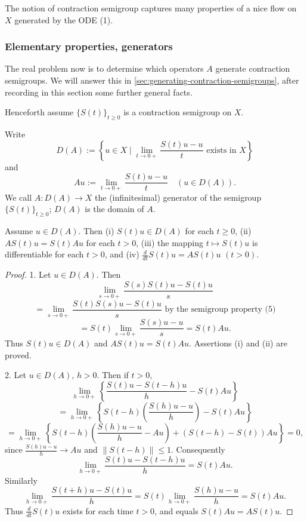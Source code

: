 The notion of contraction semigroup captures many properties of a nice flow on $X$ generated by the ODE (1).

\subsubsection{Elementary properties, generators}

The real problem now is to determine which operators $A$ generate contraction semigroups. We will answer this in \cref{sec:generating-contraction-semigroups}, after recording in this section some further general facts.

Henceforth assume $\{S(t)\}_{t \geq 0}$ is a contraction semigroup on $X$.

\begin{definition}
\label{def:semigroup-generator}
Write
\[
D(A) := \left\{u \in X \mid \lim_{t \to 0+} \frac{S(t)u - u}{t} \text{ exists in } X\right\}
\tag{8}
\]
and
\[
Au := \lim_{t \to 0+} \frac{S(t)u - u}{t} \quad (u \in D(A)).
\tag{9}
\]
We call $A : D(A) \to X$ the (infinitesimal) generator of the semigroup $\{S(t)\}_{t \geq 0}$; $D(A)$ is the domain of $A$.
\end{definition}

\begin{theorem}
\label{thm:semigroup-differential-properties}
Assume $u \in D(A)$. Then
(i) $S(t)u \in D(A)$ for each $t \geq 0$,
(ii) $AS(t)u = S(t)Au$ for each $t > 0$,
(iii) the mapping $t \mapsto S(t)u$ is differentiable for each $t > 0$,
and
(iv) $\frac{d}{dt}S(t)u = AS(t)u$ \quad $(t > 0)$.
\end{theorem}

\begin{proof}
1. Let $u \in D(A)$. Then
\[
\lim_{s \to 0+} \frac{S(s)S(t)u - S(t)u}{s}
\]
\[
= \lim_{s \to 0+} \frac{S(t)S(s)u - S(t)u}{s} \text{ by the semigroup property (5)}
\]
\[
= S(t) \lim_{s \to 0+} \frac{S(s)u - u}{s} = S(t)Au.
\]
Thus $S(t)u \in D(A)$ and $AS(t)u = S(t)Au$. Assertions (i) and (ii) are proved.

2. Let $u \in D(A)$, $h > 0$. Then if $t > 0$,
\[
\lim_{h \to 0+} \left\{ \frac{S(t)u - S(t-h)u}{h} - S(t)Au \right\}
\]
\[
= \lim_{h \to 0+} \left\{ S(t-h) \left( \frac{S(h)u - u}{h} \right) - S(t)Au \right\}
\]
\[
= \lim_{h \to 0+} \left\{ S(t-h) \left( \frac{S(h)u - u}{h} - Au \right) + (S(t-h) - S(t))Au \right\} = 0,
\]
since $\frac{S(h)u - u}{h} \to Au$ and $\|S(t-h)\| \leq 1$. Consequently
\[
\lim_{h \to 0+} \frac{S(t)u - S(t-h)u}{h} = S(t)Au.
\]
Similarly
\[
\lim_{h \to 0+} \frac{S(t+h)u - S(t)u}{h} = S(t) \lim_{h \to 0+} \frac{S(h)u - u}{h} = S(t)Au.
\]
Thus $\frac{d}{dt}S(t)u$ exists for each time $t > 0$, and equals $S(t)Au = AS(t)u$.
\end{proof}

